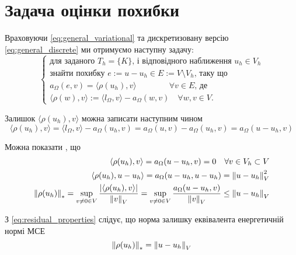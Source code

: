 
\section{Задача оцінки похибки}

Враховуючи
\eqref{eq:general_variational} та дискретизовану версію
\eqref{eq:general_discrete} ми отримуємо наступну задачу:
%
\begin{equation}\label{eq:AE_problem}
	\begin{cases}
		\mbox{для заданого } T_h=\{K\} \text{, і відповідного наближення } u_h \in V_h \\
		\text{знайти похибку } e:=u-u_h \in E := V \setminus V_h \text{, таку що} \\
		a_\Omega(e,v) = \langle\rho(u_h), v\rangle \qquad \qquad \forall v \in E \text{, де}\\
		\langle\rho(w), v\rangle := \langle l_\Omega, v\rangle - a_\Omega(w, v) \quad \forall w,v \in V.
	\end{cases}
\end{equation}

Залишок $\langle\rho(u_h), v\rangle$ можна записати наступним чином
\begin{equation*}
	\langle\rho(u_h), v\rangle
		= \langle l_\Omega, v\rangle - a_\Omega(u_h, v)
		= a_\Omega(u,v)-a_\Omega(u_h, v) = a_\Omega(u-u_h, v)
\end{equation*}

Можна показати \cite{kvasnyca2002}, що
%
\begin{equation}\label{eq:residual_properties}
	\begin{split}
		\langle\rho(u_h), v\rangle = a_\Omega(u-u_h, v) = 0 \quad \forall v \in V_h \subset V \\
		\langle\rho(u_h), u-u_h\rangle = a_\Omega(u-u_h, u-u_h) = \left\lVert u-u_h\right\rVert^2_V \\
		\left\lVert\rho(u_h)\right\rVert_* = \sup \limits_{v \ne 0 \in V} \frac{|\langle\rho(u_h), v\rangle|}{\left\lVert v\right\rVert_V} =
			\sup \limits_{v \ne 0 \in V} \frac{a_\Omega(u-u_h, v)}{\left\lVert v\right\rVert_V} \le \left\lVert u-u_h\right\rVert_V
	\end{split}
\end{equation}

З
\eqref{eq:residual_properties} слідує, що норма залишку еквівалента енергетичній нормі МСЕ
\begin{equation}
	\left\lVert\rho(u_h)\right\rVert_* = \left\lVert u-u_h\right\rVert_V
\end{equation}


